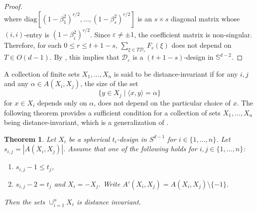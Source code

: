 \documentclass[11pt]{article}
\newtheorem{theorem}{Theorem}[section]
\theoremstyle{definition}
\theoremstyle{remark}
\begin{document}
\begin{proof}
\begin{equation*}
\end{equation*}
where $\text{diag}[(1-\beta_1^2)^{r/2},\ldots,(1-\beta_s^2)^{r/2}]$ is an $s\times s$ diagonal matrix whose $(i,i)$-entry is $(1-\beta_i^2)^{r/2}$.
Since $\varepsilon\neq\pm 1$, the coefficient matrix is non-singular.
Therefore, for each $0\leq r \leq t+1-s$, $\sum_{\xi \in T\mathcal{D}_{\varepsilon}}F_r(\xi)$ does not depend on $T\in O(d-1)$. By \cite[Definition 5.1]{DGS77}, this implies that $\mathcal{D}_{\varepsilon}$ is a $(t+1-s)$-design in $\mathbb{S}^{d-2}$. 
\end{proof}


A collection of finite sets $X_1,\ldots,X_n$ is said to be distance-invariant if for any $i,j$ and any $\alpha\in A(X_i,X_j)$, the size of the set 
\[
\{y\in X_j \mid \langle x,y\rangle=\alpha\}
\]
for $x\in X_i$ depends only on $\alpha$, does not depend on the particular choice of $x$.  
The following theorem provides a sufficient condition for a collection of  sets $X_1,\ldots,X_n$ being distance-invariant, which is a generalization of \cite[Theorem 7.4]{DGS77}.
\begin{theorem}\label{thm:di}
    Let $X_i$ be a spherical $t_i$-design in $S^{d-1}$ for $i\in\{1,\ldots,n\}$.  
    Let $s_{i,j}=|A(X_i,X_j)|$. 
    Assume that one of the following holds for $i,j\in\{1,\ldots,n\}$:
    \begin{enumerate}
        \item[{\rm (i)}] $s_{i,j}-1\leq t_j$,
        \item[{\rm (ii)}] $s_{i,j}-2= t_j$ and $X_i=-X_j$. Write $A'(X_i,X_j)=A(X_i,X_j)\setminus\{-1\}$. 
    \end{enumerate}
    Then the sets $\cup_{i=1}^n X_i$ is distance invariant.
\end{theorem}
\end{document}
